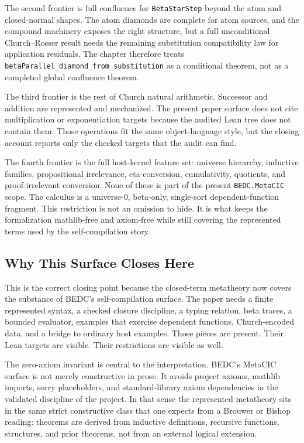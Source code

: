 The second frontier is full confluence for \texttt{BetaStarStep} beyond the
atom and closed-normal shapes.  The atom diamonds are complete for atom
sources, and the compound machinery exposes the right structure, but a full
unconditional Church--Rosser result needs the remaining substitution
compatibility law for application residuals.  The chapter therefore treats
\texttt{betaParallel\_diamond\_from\_substitution} as a conditional theorem,
not as a completed global confluence theorem.

The third frontier is the rest of Church natural arithmetic.  Successor and
addition are represented and mechanized.  The present paper surface does not
cite multiplication or exponentiation targets because the audited Lean tree
does not contain them.  Those operations fit the same object-language style,
but the closing account reports only the checked targets that the audit can
find.

The fourth frontier is the full host-kernel feature set: universe hierarchy,
inductive families, propositional irrelevance, eta-conversion, cumulativity,
quotients, and proof-irrelevant conversion.  None of these is part of the
present \texttt{BEDC.MetaCIC} scope.  The calculus is a universe-$0$,
beta-only, single-sort dependent-function fragment.  This restriction is not
an omission to hide.  It is what keeps the formalization mathlib-free and
axiom-free while still covering the represented terms used by the
self-compilation story.

\subsection{Why This Surface Closes Here}
\label{subsec:session-closing-why-close}

This is the correct closing point because the closed-term metatheory now
covers the substance of BEDC's self-compilation surface.  The paper needs a
finite represented syntax, a checked closure discipline, a typing relation,
beta traces, a bounded evaluator, examples that exercise dependent functions,
Church-encoded data, and a bridge to ordinary host examples.  Those pieces are
present.  Their Lean targets are visible.  Their restrictions are visible as
well.

The zero-axiom invariant is central to the interpretation.  BEDC's MetaCIC
surface is not merely constructive in prose.  It avoids project axioms, mathlib
imports, sorry placeholders, and standard-library axiom dependencies in the
validated discipline of the project.  In that sense the represented
metatheory sits in the same strict constructive class that one expects from a
Brouwer or Bishop reading: theorems are derived from inductive definitions,
recursive functions, structures, and prior theorems, not from an external
logical extension.

